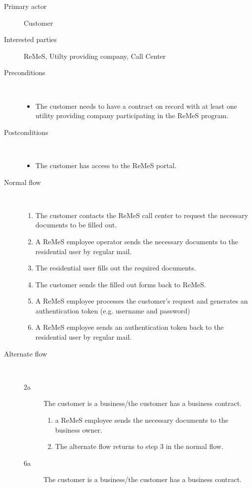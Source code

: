 \begin{description}
	\item[Primary actor] Customer
	\item[Interested parties] ReMeS, Utilty providing company, Call Center 
	\item[Preconditions] \ 
	\begin{itemize}
		\item The customer needs to have a contract on record with at least one
		utility providing company participating in the ReMeS program.
	\end{itemize}
	\item[Postconditions] \ 
	\begin{itemize}
		\item The customer has access to the ReMeS portal.
	\end{itemize}
	\item[Normal flow] \ 
	\begin{enumerate}
		\item The customer contacts the ReMeS call center to request the necessary
		documents to be filled out.
		\item A ReMeS employee operator sends the necessary documents to the
		residential user by regular mail.
		\item The residential user fills out the required documents.
		\item The customer sends the filled out forms back to ReMeS.
		\item A ReMeS employee processes the customer's request and generates an
		authentication token (e.g. username and password)
		\item A ReMeS employee sends an authentication token back to the residential
		user by regular mail.
	\end{enumerate}
	\item[Alternate flow] \ 
	\begin{description}
		\item[2a] The customer is a business/the customer has a business contract.
		\begin{enumerate}
			\item a ReMeS employee sends the necessary documents to the business owner.
			\item The alternate flow returns to step 3 in the normal flow.
		\end{enumerate}
		\item[6a] The customer is a business/the customer has a business contract.

\end{description}
\end{description}
